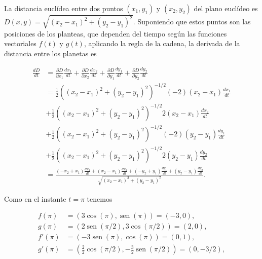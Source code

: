 \documentclass[
  spanish,
  a4paper,
]{scrreport}
\theoremstyle{definition}
\theoremstyle{remark}
\begin{document}
\begin{tcolorbox}[enhanced jigsaw, arc=.35mm, bottomrule=.15mm, bottomtitle=1mm, breakable, colback=white, colbacktitle=quarto-callout-tip-color!10!white, colframe=quarto-callout-tip-color-frame, coltitle=black, left=2mm, leftrule=.75mm, opacityback=0, opacitybacktitle=0.6, rightrule=.15mm, title=\textcolor{quarto-callout-tip-color}{\faLightbulb}\hspace{0.5em}{Solución}, titlerule=0mm, toprule=.15mm, toptitle=1mm]

La distancia euclídea entre dos puntos \((x_1, y_1)\) y \((x_2,y_2)\)
del plano euclídeo es \(D(x,y) = \sqrt{(x_2-x_1)^2 + (y_2-y_1)^2}\).
Suponiendo que estos puntos son las posiciones de los planteas, que
dependen del tiempo según las funciones vectoriales \(f(t)\) y \(g(t)\),
aplicando la regla de la cadena, la derivada de la distancia entre los
planetas es

\begin{align*}
\frac{dD}{dt}
&= \frac{\partial D}{\partial x_1}\frac{dx_1}{dt} + 
\frac{\partial D}{\partial x_2}\frac{dx_2}{dt} +
\frac{\partial D}{\partial y_1}\frac{dy_1}{dt} +
\frac{\partial D}{\partial y_2}\frac{dy_2}{dt} \\
&= \frac{1}{2}((x_2-x_1)^2 + (y_2-y_1)^2)^{-1/2}(-2)(x_2-x_1) \frac{dx_1}{dt} \\
&+ \frac{1}{2}((x_2-x_1)^2 + (y_2-y_1)^2)^{-1/2}2(x_2-x_1) \frac{dx_2}{dt} \\
&+ \frac{1}{2}((x_2-x_1)^2 + (y_2-y_1)^2)^{-1/2}(-2)(y_2-y_1) \frac{dy_1}{dt} \\
&+ \frac{1}{2}((x_2-x_1)^2 + (y_2-y_1)^2)^{-1/2}2(y_2-y_1) \frac{dy_2}{dt}\\
&= \frac{(-x_2 + x_1)\frac{dx_1}{dt} + (x_2 -x_1)\frac{dx_2}{dt} + (-y_2 + y_1)\frac{dy_1}{dt} + (y_2-y_1)\frac{dy_2}{dt}}{\sqrt{(x_2-x_1)^2 + (y_2-y_1)^2}}.
\end{align*}

Como en el instante \(t=\pi\) tenemos

\begin{align*}
f(\pi) &= (3 \cos(\pi), \operatorname{sen}(\pi)) = (-3,0),\\
g(\pi) &= (2\operatorname{sen}(\pi/2), 3\cos(\pi/2))= (2,0),\\
f'(\pi) &= (-3\operatorname{sen}(\pi), \cos(\pi)) = (0,1),\\
g'(\pi) &= \left(\frac{2}{2}\cos(\pi/2), -\frac{3}{2}\operatorname{sen}(\pi/2) \right) = (0, -3/2),
\end{align*}


\end{tcolorbox}
\end{document}
